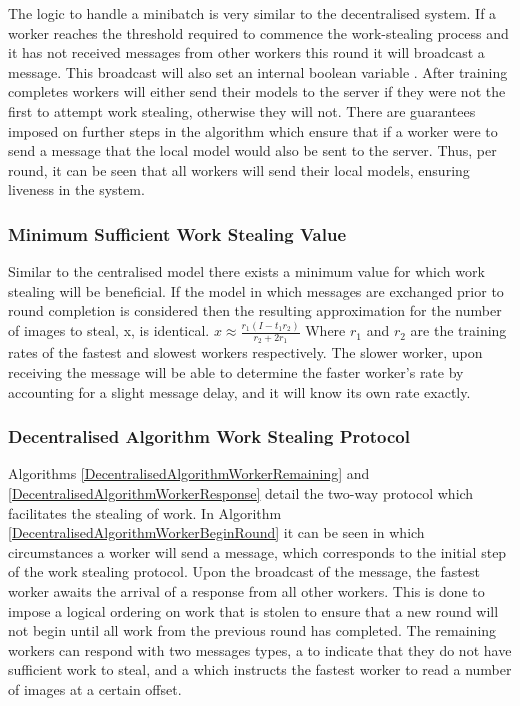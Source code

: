 \documentclass[12pt]{article}
\begin{document}
The logic to handle a minibatch is very similar to the decentralised system. If a worker reaches the threshold required to commence the work-stealing process and it has not received messages from other workers this round it will broadcast a  message. This broadcast will also set an internal boolean variable . After training completes workers will either send their models to the server if they were not the first to attempt work stealing, otherwise they will not.
\newline
There are guarantees imposed on further steps in the algorithm which ensure that if a worker were to send a  message that the local model would also be sent to the server. Thus, per round, it can be seen that all workers will send their local models, ensuring liveness in the system.

\subsubsection{Minimum Sufficient Work Stealing Value}
Similar to the centralised model there exists a minimum value for which work stealing will be beneficial. If the model in which messages are exchanged prior to round completion is considered then the resulting approximation for the number of images to steal, x,  is identical.
\newline
$x \approx \frac{r_1(I - t_1r_2)}{r_2 + 2r_1}$
\newline
Where $r_1$ and $r_2$ are the training rates of the fastest and slowest workers respectively. The slower worker, upon receiving the message will be able to determine the faster worker's rate by accounting for a slight message delay, and it will know its own rate exactly.

\subsubsection{Decentralised Algorithm Work Stealing Protocol}

Algorithms \ref{DecentralisedAlgorithmWorkerRemaining} and \ref{DecentralisedAlgorithmWorkerResponse} detail the two-way protocol which facilitates the stealing of work. In Algorithm \ref{DecentralisedAlgorithmWorkerBeginRound} it can be seen in which circumstances a worker will send a  message, which corresponds to the initial step of the work stealing protocol.
\newline
Upon the broadcast of the  message, the fastest worker awaits the arrival of a response from all other workers. This is done to impose a logical ordering on work that is stolen to ensure that a new round will not begin until all work from the previous round has completed. The remaining workers can respond with two messages types, a  to indicate that they do not have sufficient work to steal, and a  which instructs the fastest worker to read a number of images at a certain offset.
\newline
\end{document}
